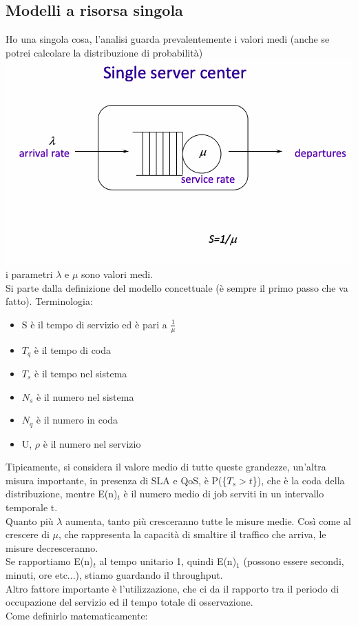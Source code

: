 \documentclass{article}
\begin{document}
\subsection{Modelli a risorsa singola}
Ho una singola cosa, l'analisi guarda prevalentemente i valori medi (anche se potrei calcolare la distribuzione di probabilità)\\
\includegraphics[scale=0.2]{images/PMCSN-4.png}\\
i parametri $\lambda$ e $\mu$ sono valori medi.\\ Si parte dalla definizione del modello concettuale (è sempre il primo passo che va fatto). Terminologia:
\begin{itemize}
\item S è il tempo di servizio ed è pari a $\frac{1}{\mu}$
\item $T_q$ è il tempo di coda
\item $T_s$ è il tempo nel sistema
\item $N_s$ è il numero nel sistema
\item $N_q$ è il numero in coda
\item U, $\rho$ è il numero nel servizio
\end{itemize}
Tipicamente, si considera il valore medio di tutte queste grandezze, un'altra misura importante, in  presenza di SLA e QoS, è P(\{$T_s > t$\}), che è la coda della distribuzione, mentre E(n)$_t$ è il numero medio di job serviti in un intervallo temporale t.\\ Quanto più $\lambda$ aumenta, tanto più cresceranno tutte le misure medie. Così come al crescere di $\mu$, che rappresenta la capacità di smaltire il traffico che arriva, le misure decresceranno.\\ Se rapportiamo E(n)$_t$ al tempo unitario 1, quindi E(n)$_1$ (possono essere secondi, minuti, ore etc...), stiamo guardando il throughput.\\ Altro fattore importante è l'utilizzazione, che ci da il rapporto tra il periodo di occupazione del servizio ed il tempo totale di osservazione.\\ Come definirlo matematicamente:\\
\end{document}
